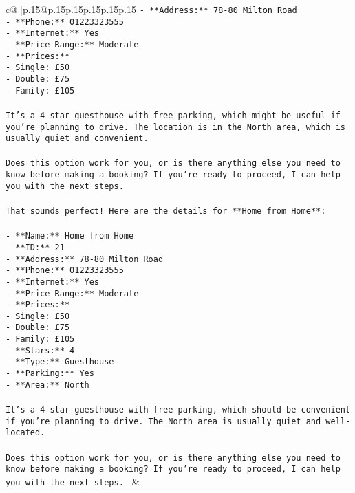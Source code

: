 \documentclass{article}
\begin{document}
{\begin{supertabular}{c@{$\;$}|p{.15\linewidth}@{}p{.15\linewidth}p{.15\linewidth}p{.15\linewidth}p{.15\linewidth}p{.15\linewidth}}
{{{\tt - **Address:** 78-80 Milton Road\\ \tt - **Phone:** 01223323555\\ \tt - **Internet:** Yes\\ \tt - **Price Range:** Moderate\\ \tt - **Prices:**\\ \tt   - Single: £50\\ \tt   - Double: £75\\ \tt   - Family: £105\\ \tt \\ \tt It's a 4-star guesthouse with free parking, which might be useful if you're planning to drive. The location is in the North area, which is usually quiet and convenient.\\ \tt \\ \tt Does this option work for you, or is there anything else you need to know before making a booking? If you're ready to proceed, I can help you with the next steps.\\ \tt \\ \tt That sounds perfect! Here are the details for **Home from Home**:\\ \tt \\ \tt - **Name:** Home from Home\\ \tt - **ID:** 21\\ \tt - **Address:** 78-80 Milton Road\\ \tt - **Phone:** 01223323555\\ \tt - **Internet:** Yes\\ \tt - **Price Range:** Moderate\\ \tt - **Prices:**\\ \tt  - Single: £50\\ \tt  - Double: £75\\ \tt  - Family: £105\\ \tt - **Stars:** 4\\ \tt - **Type:** Guesthouse\\ \tt - **Parking:** Yes\\ \tt - **Area:** North\\ \tt \\ \tt It's a 4-star guesthouse with free parking, which should be convenient if you're planning to drive. The North area is usually quiet and well-located.\\ \tt \\ \tt Does this option work for you, or is there anything else you need to know before making a booking? If you're ready to proceed, I can help you with the next steps. 
	  } 
	   } 
	   } 
	 & \\ 
 


\end{supertabular}}
\end{document}
